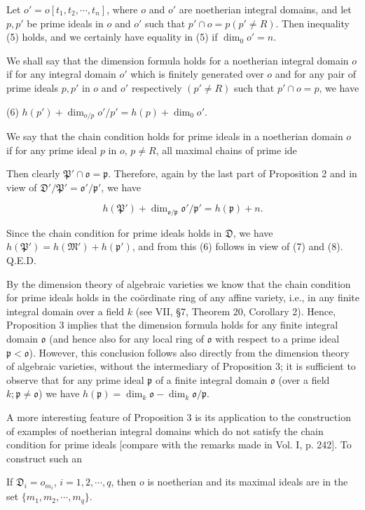 Let $o' = o[t_1, t_2, \cdots, t_n]$, where $o$ and $o'$ are noetherian integral domains, and let $p, p'$ be prime ideals in $o$ and $o'$ such that $p' \cap o = p(p' \neq R)$. Then inequality (5) holds, and we certainly have equality in (5) if $\dim_0 o' = n$.

We shall say that the dimension formula holds for a noetherian integral domain $o$ if for any integral domain $o'$ which is finitely generated over $o$ and for any pair of prime ideals $p, p'$ in $o$ and $o'$ respectively $(p' \neq R)$ such that $p' \cap o = p$, we have

(6) $h(p') + \dim_{o/p} o'/p' = h(p) + \dim_0 o'$.

We say that the chain condition holds for prime ideals in a noetherian domain $o$ if for any prime ideal $p$ in $o$, $p \neq R$, all maximal chains of prime ide

Then clearly $\mathfrak{P}' \cap \mathfrak{o} = \mathfrak{p}$. Therefore, again by the last part of Proposition 2 and in view of $\mathfrak{D}' / \mathfrak{P}' = \mathfrak{o}' / \mathfrak{p}'$, we have

$$h(\mathfrak{P}') + \dim_{\mathfrak{o} / \mathfrak{p}} \mathfrak{o}' / \mathfrak{p}' = h(\mathfrak{p}) + n.$$

Since the chain condition for prime ideals holds in $\mathfrak{D}$, we have $h(\mathfrak{P}') = h(\mathfrak{M}') + h(\mathfrak{p}')$, and from this (6) follows in view of (7) and (8). Q.E.D.

By the dimension theory of algebraic varieties we know that the chain condition for prime ideals holds in the coördinate ring of any affine variety, i.e., in any finite integral domain over a field $k$ (see VII, §7, Theorem 20, Corollary 2). Hence, Proposition 3 implies that the dimension formula holds for any finite integral domain $\mathfrak{o}$ (and hence also for any local ring of $\mathfrak{o}$ with respect to a prime ideal $\mathfrak{p} < \mathfrak{o}$). However, this conclusion follows also directly from the dimension theory of algebraic varieties, without the intermediary of Proposition 3; it is sufficient to observe that for any prime ideal $\mathfrak{p}$ of a finite integral domain $\mathfrak{o}$ (over a field $k; \mathfrak{p} \neq \mathfrak{o}$) we have $h(\mathfrak{p}) = \dim_k \mathfrak{o} - \dim_k \mathfrak{o} / \mathfrak{p}$.

A more interesting feature of Proposition 3 is its application to the construction of examples of noetherian integral domains which do not satisfy the chain condition for prime ideals [compare with the remarks made in Vol. I, p. 242]. To construct such an

If $\mathfrak{D}_i = o_{m_i}$, $i = 1, 2, \cdots, q$, then $o$ is noetherian and its maximal ideals are in the set $\{m_1, m_2, \cdots, m_q\}$.